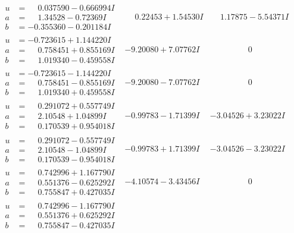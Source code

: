 \documentclass[1p]{elsarticle_modified}
\theoremstyle{definition}
\begin{document}
$$\begin{array}{c|c|c}
\begin{aligned}
u &= \phantom{-}0.037590 - 0.666994 I \\
a &= \phantom{-}1.34528 - 0.72369 I \\
b &= -0.355360 - 0.201184 I\end{aligned}
 & \phantom{-}0.22453 + 1.54530 I & \phantom{-}1.17875 - 5.54371 I \\ \hline\begin{aligned}
u &= -0.723615 + 1.144220 I \\
a &= \phantom{-}0.758451 + 0.855169 I \\
b &= \phantom{-}1.019340 - 0.459558 I\end{aligned}
 & -9.20080 + 7.07762 I & \phantom{-0.000000 } 0 \\ \hline\begin{aligned}
u &= -0.723615 - 1.144220 I \\
a &= \phantom{-}0.758451 - 0.855169 I \\
b &= \phantom{-}1.019340 + 0.459558 I\end{aligned}
 & -9.20080 - 7.07762 I & \phantom{-0.000000 } 0 \\ \hline\begin{aligned}
u &= \phantom{-}0.291072 + 0.557749 I \\
a &= \phantom{-}2.10548 + 1.04899 I \\
b &= \phantom{-}0.170539 + 0.954018 I\end{aligned}
 & -0.99783 - 1.71399 I & -3.04526 + 3.23022 I \\ \hline\begin{aligned}
u &= \phantom{-}0.291072 - 0.557749 I \\
a &= \phantom{-}2.10548 - 1.04899 I \\
b &= \phantom{-}0.170539 - 0.954018 I\end{aligned}
 & -0.99783 + 1.71399 I & -3.04526 - 3.23022 I \\ \hline\begin{aligned}
u &= \phantom{-}0.742996 + 1.167790 I \\
a &= \phantom{-}0.551376 - 0.625292 I \\
b &= \phantom{-}0.755847 + 0.427035 I\end{aligned}
 & -4.10574 - 3.43456 I & \phantom{-0.000000 } 0 \\ \hline\begin{aligned}
u &= \phantom{-}0.742996 - 1.167790 I \\
a &= \phantom{-}0.551376 + 0.625292 I \\
b &= \phantom{-}0.755847 - 0.427035 I\end{aligned}

\end{array}$$
\end{document}
